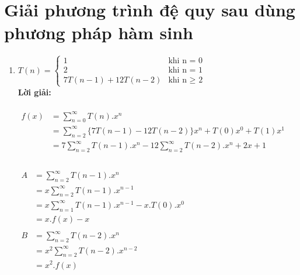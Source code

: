 \documentclass[12pt, letterpaper]{article}
\begin{document}
\section{Giải phương trình đệ quy sau dùng phương pháp hàm sinh}
\begin{enumerate}
	\item
	      $T(n) =
		      \begin{cases}
			      1                    & \text{khi n = 0}      \\
			      2                    & \text{khi n = 1}      \\
			      7T(n - 1) + 12T(n-2) & \text{khi n $\geq$ 2}
		      \end{cases} $ \\
	      \textbf{Lời giải:} \\
	       \\
	      $\begin{aligned}
			      f(x) & = \sum_{n = 0}^{\infty}T(n).x^n                                                 \\
			           & = \sum_{n = 2}^{\infty} \{ 7T(n-1)-12T(n-2) \}x^n + T(0)x^0 + T(1)x^1           \\
			           & = 7\sum_{n = 2}^{\infty}T(n-1).x^n - 12\sum_{n = 2}^{\infty} T(n-2).x^n + 2x +1 \\
		      \end{aligned} $ \\

	      \\
	      $\begin{aligned}
			      A & = \sum_{n = 2}^{\infty}T(n-1).x^n                  \\
			        & =x\sum_{n = 2}^{\infty}T(n-1).x^{n-1}              \\
			        & =x\sum_{n = 1}^{\infty}T(n-1).x^{n-1} - x.T(0).x^0 \\
			        & =x.f(x) - x                                        \\
		      \end{aligned}$\\
	      $\begin{aligned}
			      B & =\sum_{n = 2}^{\infty}T(n-2).x^n        \\
			        & =x^2\sum_{n = 2}^{\infty}T(n-2).x^{n-2} \\
			        & =x^2.f(x)
		      \end{aligned}$\\


\end{enumerate}
\end{document}
